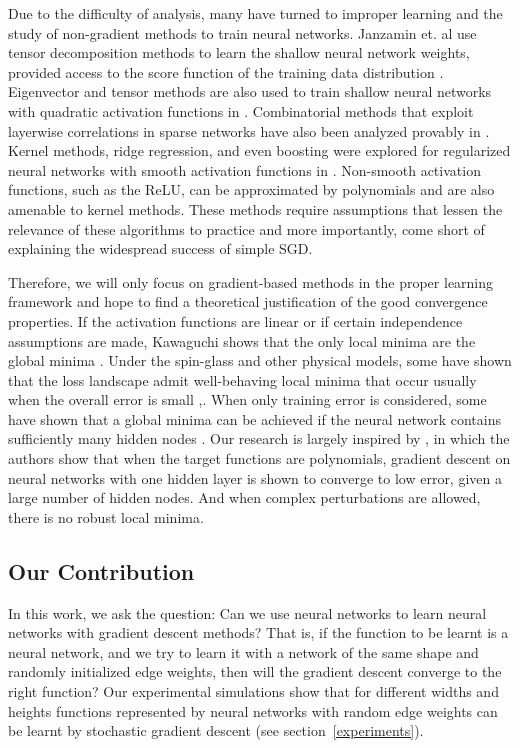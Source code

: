 \documentclass{article}
\begin{document}
Due to the difficulty of analysis, many have turned to improper learning and the study of non-gradient methods to train neural networks. Janzamin et. al use tensor decomposition methods to learn the shallow neural network weights, provided access to the score function of the training data distribution \cite{JanzaminSA15}. Eigenvector and tensor methods are also used to train shallow neural networks with quadratic activation functions in \cite{LivniSS14}. Combinatorial methods that exploit layerwise correlations in sparse networks have also been analyzed provably in \cite{AroraBGM13}. Kernel methods, ridge regression, and even boosting were explored for regularized neural networks with smooth activation functions in \cite{shalev2011learning}\cite{ZhangLWJ15}\cite{ZhangLJ15}. Non-smooth activation functions, such as the ReLU, can be approximated by polynomials and are also amenable to kernel methods\cite{GoelKKT16}. These methods require assumptions that lessen the relevance of these algorithms to practice and more importantly, come short of explaining the widespread success of simple SGD.

Therefore, we will only focus on gradient-based methods in the proper learning framework and hope to find a theoretical justification of the good convergence properties. If the activation functions are linear or if certain independence assumptions are made, Kawaguchi shows that the only local minima are the global minima \cite{Kawaguchi16a}. Under the spin-glass and other physical models, some have shown that the loss landscape admit well-behaving local minima that occur usually when the overall error is small \cite{ChoromanskaHMAL14},\cite{DauphinPGCGB14}. When only training error is considered, some have shown that a global minima can be achieved if the neural network contains sufficiently many hidden nodes \cite{SoudryC16}. Our research is largely inspired by \cite{valiant2014learning}, in which the authors show that when the target functions are polynomials, gradient descent on neural networks with one hidden layer is shown to converge to low error, given a large number of hidden nodes. And when complex perturbations are allowed, there is no robust local minima. 

\subsection{Our Contribution}


In this work, we ask the question: Can we use neural networks to learn neural networks with gradient descent methods? That is, if the function to be learnt is a neural network, and we try to learn it with a network of the same shape and randomly initialized edge weights, then will the gradient descent converge to the right function? Our experimental simulations show that for different widths and heights functions represented by neural networks with random edge weights can be learnt by stochastic gradient descent (see section~\ref{experiments}).
\end{document}
